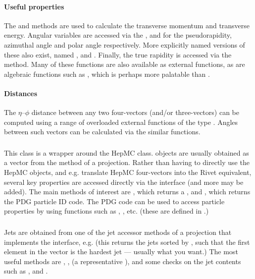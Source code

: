\documentclass{JHEP3}
\begin{document}
\paragraph{Useful properties}%
The  and  methods are used to calculate the transverse
momentum and transverse energy. Angular variables are accessed via the
,  and  for the pseudorapidity, azimuthal
angle and polar angle respectively. More explicitly named versions of these also
exist, named ,  and
. Finally, the true rapidity is accessed via the
 method. Many of these functions are also available as external
functions, as are algebraic functions such as , which is
perhaps more palatable than .

\paragraph{Distances}%
The $\eta$--$\phi$ distance between any two four-vectors (and/or three-vectors)
can be computed using a range of overloaded external functions of the type
. Angles between such vectors can be calculated via the
similar  functions.

\subsubsection{}
This class is a wrapper around the HepMC 
class.  objects are usually obtained as a vector from the
 method of a  projection.  Rather than having
to directly use the HepMC objects, and e.g. translate HepMC four-vectors into
the Rivet equivalent, several key properties are accessed directly via the
 interface (and more may be added). The main methods of interest
are , which returns a , and ,
which returns the PDG particle ID code. The PDG code can be used to access
particle properties by using functions such as ,
, etc. (these are defined in
.)

\subsubsection{}
Jets are obtained from one of the jet accessor methods of a projection that
implements the  interface, e.g.  (this
returns the jets sorted by \pT, such that the first element in the vector is the
hardest jet --- usually what you want.) The most useful methods are
, ,  (a representative
), and some checks on the jet contents such as
,  and
.
\end{document}

